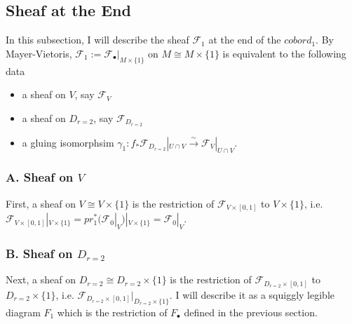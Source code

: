 \subsection*{Sheaf at the End}
In this subsection, I will describe the sheaf $\mathscr{F}_1$ at the end of the $cobord_1$. By Mayer-Vietoris, $\mathscr{F}_1:= \mathscr{F}_\bullet|_{M\times\{1\}}$ on $M \cong M\times\{1\}$ is equivalent to the following data
\begin{itemize}
\item a sheaf on $V$, say $\mathscr{F}_{V}$

\item a sheaf on $D_{r=2}$, say $\mathscr{F}_{D_{r=2}}$

\item a gluing isomorphsim $\gamma_1 : f_*\mathscr{F}_{D_{r=2}}|_{U\cap V} \xrightarrow{\sim} \mathscr{F}_{V}|_{U\cap V}$.
\end{itemize}

\subsubsection{A. Sheaf on $V$}
First, a sheaf on $V\cong V\times\{1\}$ is the restriction of $\mathscr{F}_{V\times [0,1]}$ to $V\times \{1\}$, i.e. $\mathscr{F}_{V\times [0,1]}|_{V\times \{1\}}= pr_1^*(\mathscr{F}_0|_V)|_{V\times \{1\}} = \mathscr{F}_0|_V$.
\subsubsection{B. Sheaf on $D_{r=2}$}
Next, a sheaf on $D_{r=2}\cong D_{r=2}\times \{1\}$ is the restriction of $\mathscr{F}_{D_{r=2}\times [0,1]}$ to $D_{r=2}\times \{1\}$, i.e. $\mathscr{F}_{D_{r=2}\times [0,1]} |_{D_{r=2}\times \{1\}}$. I will describe it as a squiggly legible diagram $F_1$ which is the restriction of $F_\bullet$ defined in the previous section.

